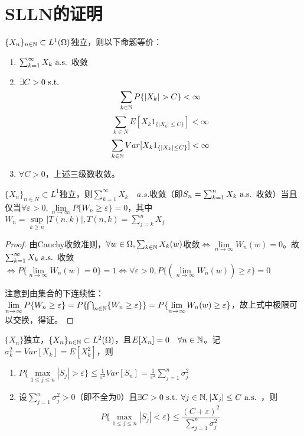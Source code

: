 \documentclass{ctexart}
\begin{document}
\section{SLLN的证明}
\begin{Thm}
  $\{X_{n}\}_{n\in\mathbb{N}}\subset L^{1}(\Omega)$独立，则以下命题等价：
  \begin{enumerate}
  \item $\sum_{k=1}^{\infty}X_{k}\text{ a.s. }$收敛
  \item $\exists C>0\text{ s.t. }$
    \[\sum_{k\in\N}P\{|X_{k}|>C\}<\infty\]
    \[\sum_{k\in N}E[X_{k}1_{\{|X_{k}|\leq C\}}]<\infty\]
    \[\sum_{k\in\mathbb{N}}Var[X_{k}1_{\{|X_{k}|\leq C\}}]<\infty\]
  \item $\forall C>0$，上述三级数收敛。
  \end{enumerate}
\end{Thm}

\begin{Lemma}\label{Lem-1}
  $\{X_{n}\}_{n\in N}\subset L^{1}$独立，则$\sum_{k=1}^{\infty}X_{k}\quad a.s.$收敛（即$S_{n}=\sum_{k=1}^{n}X_{k}\text{ a.s. }$收敛）当且仅当$\forall\varepsilon>0,\lim\limits_{n\to\infty}P\{W_{n}\geq \varepsilon\}=0$，其中$W_{n}=\sup\limits_{k\geq n}|T(n,k)|, T(n,k)=\sum_{j=k}^{n}X_{j}$
\end{Lemma}  

\begin{proof}
  由Cauchy收敛准则，$\forall w\in \Omega, \sum_{k\in\mathbb{N}}X_{k}(w)$收敛$\Leftrightarrow \lim\limits_{n\to\infty}W_{n}(w)=0$。故$\sum_{k=1}^{\infty}X_{k}\text{ a.s. }$收敛$\Leftrightarrow P\{\lim\limits_{n\to\infty}W_{n}(w)=0\}=1\Leftrightarrow \forall\varepsilon>0, P\{(\lim\limits_{n\to\infty} W_{n}(w))\geq\varepsilon\}=0$

  注意到由集合的下连续性：$\lim\limits_{n\to\infty}P\{W_{n}\geq\varepsilon\}=P\{\bigcap_{n\in\mathbb{N}}\{W_{n}\geq\varepsilon\}\}=P\{\lim\limits_{n\to\infty} W_{n}(w)\geq\varepsilon\}$，故上式中极限可以交换，得证。
\end{proof}

\begin{Lemma}\label{Lem-2}
  $\{X_{n}\}$独立，$\{X_{n}\}_{n\in\mathbb{N}}\subset L^{2}(\Omega)$，且$E[X_{n}]=0\quad\forall n\in\mathbb{N}$。记$\sigma^{2}_{k}=Var[X_{k}]=E[X_{k}^{2}]$，则
  \begin{enumerate}
  \item $P\{\max\limits_{1\leq j\leq n}|S_{j}|>\varepsilon\}\leq \frac{1}{\varepsilon^{2}}Var[S_{n}]=\frac{1}{\varepsilon^{2}}\sum_{j=1}^{n}\sigma_{j}^{2}$
  \item 设$\sum_{j=1}^{n}\sigma_{j}^{2}>0$（即不全为0）且$\exists C>0\text{ s.t. } \forall j\in\mathbb{N}, |X_{j}|\leq C\text{ a.s. }$，则
    \[P\{\max\limits_{1\leq j\leq n}|S_{j}|<\varepsilon\}\leq \frac{(C+\varepsilon)^{2}}{\sum_{j=1}^{n}\sigma_{j}^{2}}\]
  \end{enumerate}
\end{Lemma}
\end{document}
